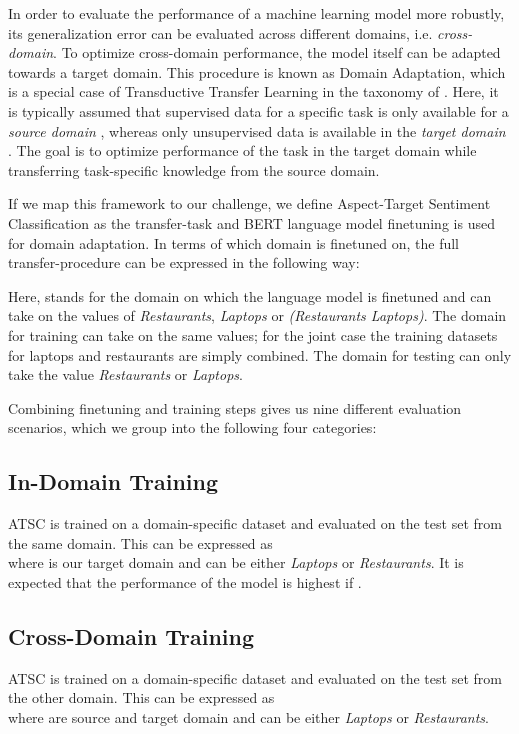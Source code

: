 \documentclass[11pt,a4paper]{article}
\begin{document}
In order to evaluate the performance of a machine learning model more robustly,
its generalization error can be evaluated across different domains, i.e. \textit{cross-domain}. To optimize cross-domain performance, the model itself can be adapted towards a target domain. This procedure is known as Domain Adaptation, which is a special case of Transductive Transfer Learning in the taxonomy of \citet{Ruder2019}. Here, it is typically assumed that supervised data for a specific task is only available for a \textit{source domain} , whereas only unsupervised data is available in the \textit{target domain} . The goal is to optimize performance of the task in the target domain while transferring task-specific knowledge from the source domain.

If we map this framework to our challenge, we define Aspect-Target Sentiment Classification as the transfer-task and BERT language model finetuning is used for domain adaptation. In terms of which domain is finetuned on, the full transfer-procedure can be expressed in the following way:



Here,  stands for the domain on which the language model is finetuned and can take on the values of \textit{Restaurants}, \textit{Laptops} or \textit{(Restaurants  Laptops)}.
The domain for training  can take on the same values; for the joint case the training datasets for laptops and restaurants are simply combined.
The domain for testing  can only take the value \textit{Restaurants} or \textit{Laptops}.


Combining finetuning and training steps gives us nine different evaluation scenarios, which we group into the following four categories: 

\subsection*{In-Domain Training} 
ATSC is trained on a domain-specific dataset and evaluated on the test set from the same domain. This can be expressed as \\ where  is our target domain and can be either \textit{Laptops} or \textit{Restaurants}. It is expected that the performance of the model is highest if .

\subsection*{Cross-Domain Training}
ATSC is trained on a domain-specific dataset and evaluated on the test set from the other domain. This can be expressed as \\ where  are source and target domain and can be either \textit{Laptops} or \textit{Restaurants}.
\end{document}
